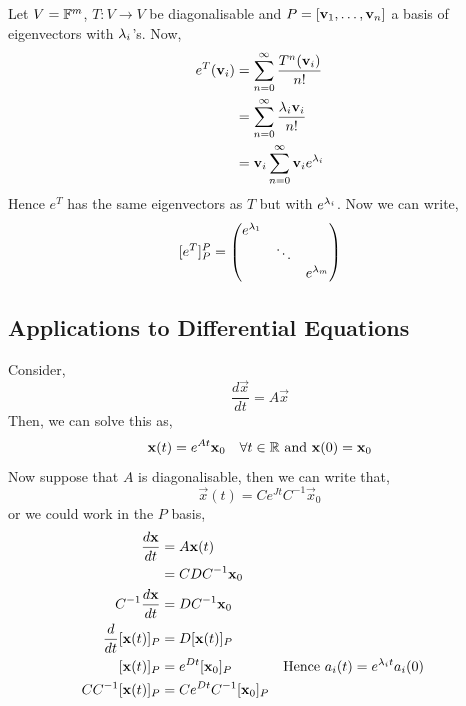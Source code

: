 \documentclass{article}
\begin{document}
Let $V = \mathbb{F}^m$, $T: V \to V$ be diagonalisable and $P = [\boldsymbol{\mathbf{v}}_1, \dots, \boldsymbol{\mathbf{v}}_n]$ a basis of eigenvectors with $\lambda_i$'s. Now,
\begin{align*}
  e^T(\boldsymbol{\mathbf{v}}_i) &= \sum_{n=0}^\infty {\frac{T^n(\boldsymbol{\mathbf{v}}_i)}{n!}}\\
  &= \sum_{n=0}^\infty { \frac{\lambda_i\boldsymbol{\mathbf{v}}_i}{n!}}\\
  &= \boldsymbol{\mathbf{v}}_i\sum_{n=0}^\infty {\boldsymbol{\mathbf{v}}_i e^{\lambda_i}}
\end{align*}
Hence $e^T$ has the same eigenvectors as $T$ but with $e^{\lambda_i}$. Now we can write,
$$ [e^T]_P^P = \begin{pmatrix}
  e^{\lambda_1} && \\
  & \ddots & \\
  && e^{\lambda_m}
\end{pmatrix} $$

\subsection{Applications to Differential Equations}
Consider,
$$ \frac{d\vec x}{dt} = A\vec x$$
Then, we can solve this as,
$$ \boldsymbol{\mathbf{x}}(t) = e^{At}\boldsymbol{\mathbf{x}}_0 \quad \forall t \in \mathbb{R} \text{ and } \boldsymbol{\mathbf{x}}(0) = \boldsymbol{\mathbf{x}}_0 $$
Now suppose that $A$ is diagonalisable, then we can write that,
$$ \vec x(t) = Ce^{Jt}C^{-1}\vec x_0 $$
or we could work in the $P$ basis,
\begin{align*}
  \frac{d\vec x}{dt} &= A\vec x(t)\\
  &= CDC^{-1}\vec x_0\\
  C^{-1}\frac{d\vec x}{dt} &= DC^{-1}\vec x_0\\
  \frac{d}{dt}[\vec x(t)]_P &= D[\vec x(t)]_P \\
  [\vec x(t)]_P &= e^{Dt}[\vec x_0]_P && \text{Hence $a_i(t) = e^{\l_i t}a_i(0)$}\\
  CC^{-1}[\vec x(t)]_P &= Ce^{Dt}C^{-1}[\vec x_0]_P\\
\end{align*}

\begin{center}
\end{center}
\end{document}
